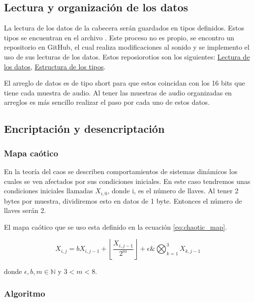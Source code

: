 \subsection{Lectura y organización de los datos}

La lectura de los datos de la cabecera serán guardados en tipos definidos. Estos tipos se encuentran en el archivo . Este proceso no es propio, se encontro un repositorio en GitHub, el cual realiza modificaciones al sonido y se implemento el uso de sus lecturas de los datos. Estos reposiorotios son los siguientes: \href{https://github.com/fabrizzio-gz/wav/}{Lectura de los datos}, \href{https://topic.alibabacloud.com/a/c-language-parsing-wav-audio-files_1_31_30000716.html}{Estructura de los tipos}.

El arreglo de datos es de tipo short para que estos coincidan con los 16 bits que tiene cada muestra de audio. Al tener las muestras de audio organizadas en arreglos es más sencillo realizar el paso por cada uno de estos datos.

\subsection{Encriptación y desencriptación}

\subsubsection{Mapa caótico}

En la teoría del caos se describen comportamientos de sistemas dinámicos los cuales se ven afectados por sus condiciones iniciales\cite{ott_2002}. En este caso tendremos unas condiciones iniciales llamadas $X_{i,0}$, donde i, es el número de llaves. Al tener 2 bytes por muestra, dividiremos esto en datos de 1 byte. Entonces el número de llaves serán 2.

El mapa caótico que se uso esta definido en la ecuación \ref{eq:chaotic_map}.

\begin{equation}
    X_{i,j} = b X_{i,j-1} + \left \lfloor \frac{X_{i,j-1}}{2^m} \right \rfloor + \epsilon \& \bigotimes_{k=1}^3 X_{k,j-1} \label{eq:chaotic_map}
\end{equation}

donde $\epsilon, b, m \in \mathbb{N}$ y $3<m<8$.

\subsubsection{Algoritmo}

